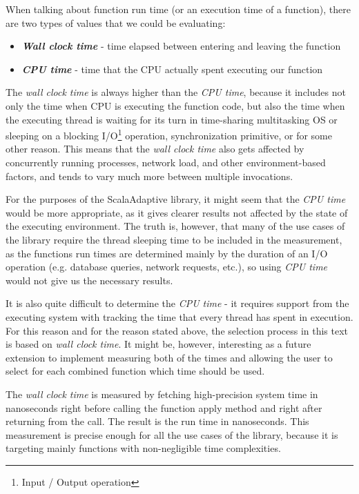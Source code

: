 When talking about function run time (or an execution time of a function), there are two types of values that we could be evaluating:

\begin{itemize}
	\item \textbf{\textit{Wall clock time}} - time elapsed between entering and leaving the function
	\item \textbf{\textit{CPU time}} - time that the CPU actually spent executing our function
\end{itemize}

The \textit{wall clock time} is always higher than the \textit{CPU time}, because it includes not only the time when CPU is executing the function code, but also the time when the executing thread is waiting for its turn in time-sharing multitasking OS or sleeping on a blocking I/O\footnote{Input / Output operation} operation, synchronization primitive, or for some other reason. This means that the \textit{wall clock time} also gets affected by concurrently running processes, network load, and other environment-based factors, and tends to vary much more between multiple invocations.

For the purposes of the ScalaAdaptive library, it might seem that the \textit{CPU time} would be more appropriate, as it gives clearer results not affected by the state of the executing environment. The truth is, however, that many of the use cases of the library require the thread sleeping time to be included in the measurement, as the functions run times are determined mainly by the duration of an I/O operation (e.g. database queries, network requests, etc.), so using \textit{CPU time} would not give us the necessary results.

It is also quite difficult to determine the \textit{CPU time} - it requires support from the executing system with tracking the time that every thread has spent in execution. For this reason and for the reason stated above, the selection process in this text is based on \textit{wall clock time}. It might be, however, interesting as a future extension to implement measuring both of the times and allowing the user to select for each combined function which time should be used.

The \textit{wall clock time} is measured by fetching high-precision system time in nanoseconds right before calling the function apply method and right after returning from the call. The result is the run time in nanoseconds. This measurement is precise enough for all the use cases of the library, because it is targeting mainly functions with non-negligible time complexities.

